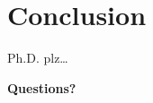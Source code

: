 \documentclass{beamer}	%
\theoremstyle{plain}
\theoremstyle{definition}
\theoremstyle{remark}
\numberwithin{equation}{section}
\begin{document}
\section{Conclusion}



\begin{frame}
Ph.D. plz\dots
\end{frame}



\begin{frame}
\begin{center} {\bfseries \Large Questions?} \end{center}
\end{frame}
\end{document}
